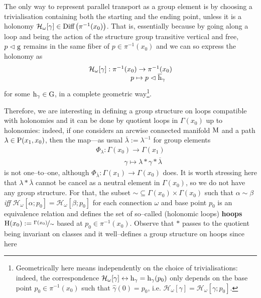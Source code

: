 \begin{remark}\label{holonomy_group_element}
    The only way to represent parallel transport as a group element is by choosing a trivialisation containing both the starting and the ending point, unless it is a holonomy $\mathcal{H}_\omega[\gamma]\in\Diffeo\left(\pi^{-1}(x_0)\right)$. That is, essentially because by going along a loop and being the action of the structure group transitive vertical and free, $p\vartriangleleft\g$ remains in the same fiber of $p\in\pi^{-1}(x_0)$ and we can so express the holonomy as
    $$\begin{matrix}
        \mathcal{H}_\omega[\gamma]:\pi^{-1}(x_0)\to\pi^{-1}(x_0)\\
        \qquad\qquad\quad p\mapsto p\vartriangleleft\overline{\h}_\gamma
    \end{matrix}$$
    for some $\h_\gamma\in\G$, in a complete geometric way\footnote{Geometrically here means independently on the choice of trivialisations: indeed, the correspondence $\mathcal{H}_\omega[\gamma]\leftrightarrow\h_\gamma=\h_\gamma(p_0)$ only depends on the base point $p_0\in\pi^{-1}(x_0)$ such that $\widehat{\gamma}(0)=p_0$, i.e. $\mathcal{H}_\omega[\gamma]=\mathcal{H}_\omega[\gamma;p_0].$}.
\end{remark}
Therefore, we are interesting in defining a group structure on loops compatible with holonomies and it can be done by quotient loops in $\Gamma(x_0)$ up to holonomies: indeed, if one considers an arcwise connected manifold $\M$ and a path $\lambda\in\P(x_1,x_0)$, then the map---as usual $\overline{\lambda}:=\lambda^{-1}$ for group elements
$$\begin{matrix}
    \Phi_\lambda:\Gamma(x_0)\to\Gamma(x_1)\\
    \qquad\qquad \gamma\mapsto\lambda*\gamma*\overline{\lambda}
\end{matrix}$$
is not one--to--one, although $\Phi_{\overline{\lambda}}:\Gamma(x_1)\to\Gamma(x_0)$ does. It is worth stressing here that $\lambda*\overline{\lambda}$ cannot be cancel as a neutral element in $\Gamma(x_0)$, so we do not have any group structure. For that, the subset $\sim\subseteq\Gamma(x_0)\times\Gamma(x_0)$ such that $\alpha\sim\beta$ \emph{iff} $\mathcal{H}_\omega[\alpha;p_0]=\mathcal{H}_\omega[\beta;p_0]$ for each connection $\omega$ and base point $p_0$ is an equivalence relation and defines the set of so--called (holonomic loops) \textbf{hoops} $\H(x_0):=\nicefrac{\Gamma(x_0)}{\sim}$ based at $p_0\in\pi^{-1}(x_0)$. Observe that $*$ passes to the quotient being invariant on classes and it well--defines a group structure on hoops since here
